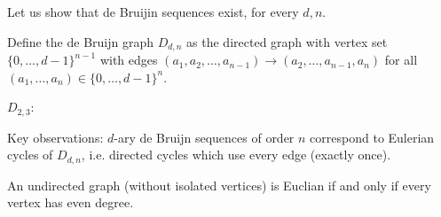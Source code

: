 Let us show that de Bruijin sequences exist, for every $d,n$. 
\begin{definition}
Define the de Bruijn graph $D_{d,n}$ as the directed graph with vertex set $\{0,\ldots,d-1\}^{n-1}$ with edges $(a_1,a_2,\ldots,a_{n-1})\to (a_2,\ldots,a_{n-1},a_n)$ for all $(a_1,\ldots,a_n)\in\{0,\ldots,d-1\}^n$.
\end{definition}

\begin{example}
$D_{2,3}$:\begin{flushleft}\end{flushleft}
\begin{center}
\end{center}
\end{example}

Key observations: $d$-ary de Bruijn sequences of order $n$ correspond to Eulerian cycles of $D_{d,n}$, i.e. directed cycles which use every edge (exactly once).

\begin{theorem}[Euler]
An undirected graph (without isolated vertices) is Euclian if and only if every vertex has even degree.
\end{theorem}